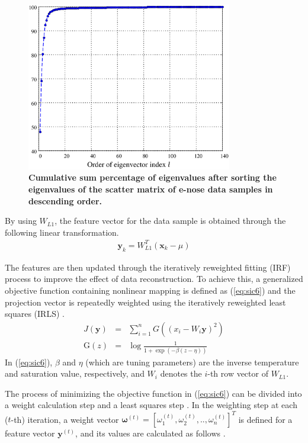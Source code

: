 \documentclass[10pt,letterpaper]{article}
\begin{document}
\begin{figure}[t]
	\centering
    \includegraphics[width=0.8\textwidth]{eigenvector.eps}
    \caption{\bf{Cumulative sum percentage of eigenvalues after sorting the eigenvalues of the scatter matrix of e-nose data samples in descending order.} \label{null Fig. 2}}
\end{figure}
By using $W_{L1}$, the feature vector for the data sample is obtained through the following linear transformation.
\begin{eqnarray}
\label{eq:sic5}
	\textbf{y}_k = W_{L1}^T\left(\textbf{x}_k-\mu\right)
\end{eqnarray}

The features are then updated through the iteratively reweighted fitting (IRF) process \cite{zuo2006robust} to improve the effect of data reconstruction. 
To achieve this, a generalized objective function containing nonlinear mapping is defined as (\ref{eq:sic6}) and the projection vector is repeatedly weighted using the iteratively reweighted least squares (IRLS) \cite{ha2005integrated}.
\begin{eqnarray}
\label{eq:sic6}
	J(\textbf{y}) &=& \sum\limits_{i=1}^{n}G\left(\left(x_i-W_{i}\textbf{y}\right)^2\right)\nonumber\\ \mathrm G(z) &=& \log\frac{1}{1+\exp\left(-\beta\left(z-\eta\right)\right)}  
\end{eqnarray}
In (\ref{eq:sic6}), $\beta$ and $\eta$ (which are tuning parameters) are the inverse temperature and saturation value, respectively, and $W_i$ denotes the $i$-th row vector of $W_{L1}$. 

The process of minimizing the objective function in (\ref{eq:sic6}) can be divided into a weight calculation step and a least squares step \cite{zuo2006robust}. 
In the weighting step at each ($t$-th) iteration, a weight vector $\boldsymbol{\omega}^{\left(t\right)}=\left[{\omega}_{1}^{\left(t\right)},{\omega}_{2}^{\left(t\right)},..,{\omega}_{n}^{\left(t\right)}\right]^{T}$ is defined for a feature vector $\textbf{y}^{(t)}$, and its values are calculated as follows \cite{zuo2006robust}. 
\end{document}
